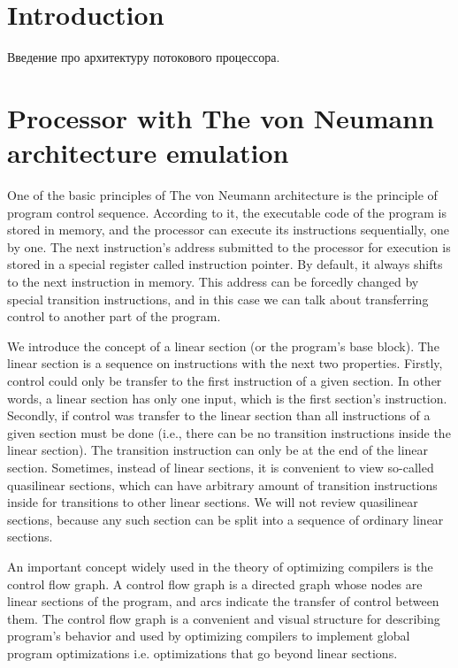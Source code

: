 \documentclass[
11pt,%
tightenlines,%
twoside,%
onecolumn,%
nofloats,%
nobibnotes,%
nofootinbib,%
superscriptaddress,%
noshowpacs,%
centertags]%
{revtex4}
\begin{document}
\section{Introduction}

Введение про архитектуру потокового процессора.

\section{Processor with The von Neumann architecture emulation}

One of the basic principles of The von Neumann architecture is the principle of program control sequence. According to it, the executable code of the program is stored in memory, and the processor can execute its instructions sequentially, one by one. The next instruction’s address submitted to the processor for execution is stored in a special register called instruction pointer. By default, it always shifts to the next instruction in memory. This address can be forcedly changed by special transition instructions, and in this case we can talk about transferring control to another part of the program.

We introduce the concept of a linear section (or the program’s base block). The linear section is a sequence on instructions with the next two properties. Firstly, control could only be transfer to the first instruction of a given section. In other words, a linear section has only one input, which is the first section’s instruction. Secondly, if control was transfer to the linear section than all instructions of a given section must be done (i.e., there can be no transition instructions inside the linear section). The transition instruction can only be at the end of the linear section. Sometimes, instead of linear sections, it is convenient to view so-called quasilinear sections, which can have arbitrary amount of transition instructions inside for transitions to other linear sections. We will not review quasilinear sections, because any such section can be split into a sequence of ordinary linear sections.

An important concept widely used in the theory of optimizing compilers is the control flow graph. A control flow graph is a directed graph whose nodes are linear sections of the program, and arcs indicate the transfer of control between them. The control flow graph is a convenient and visual structure for describing program’s behavior and used by optimizing compilers to implement global program optimizations i.e. optimizations that go beyond linear sections.
\end{document}
